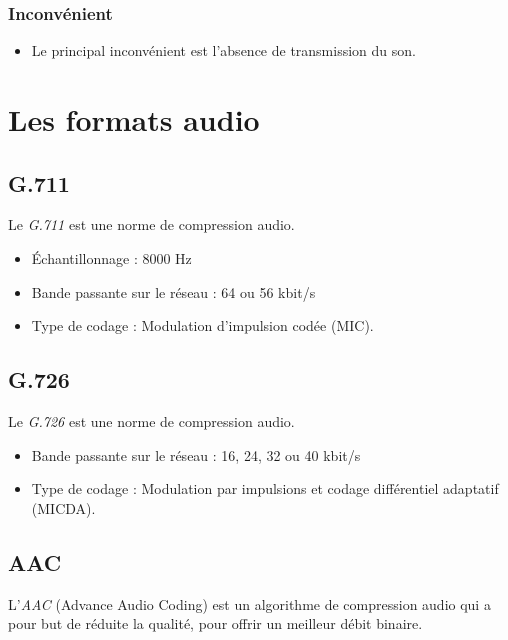 		\subsubsection{Inconvénient}
		\begin{itemize}
		  \item Le principal inconvénient est l'absence de transmission du son.
		  \newline
		\end{itemize}
		
	\section{Les formats audio}
		\subsection{G.711}
			Le \textit{G.711} est une norme de compression audio.
			\begin{itemize}
			  \item Échantillonnage : 8000 Hz 
			  \item Bande passante sur le réseau : 64 ou 56 kbit/s
			  \item Type de codage : Modulation d'impulsion codée (MIC).
			\end{itemize}
		\subsection{G.726}
			Le \textit{G.726} est une norme de compression audio.
			\begin{itemize}
			  	\item Bande passante sur le réseau : 16, 24, 32 ou 40 kbit/s
				\item Type de codage : Modulation par impulsions et codage différentiel
				adaptatif (MICDA).
				\end{itemize}
		\subsection{AAC}
			L'\textit{AAC} (Advance Audio Coding) est un algorithme de compression audio
			qui a pour but de réduite la qualité, pour offrir un meilleur débit binaire.
\newline